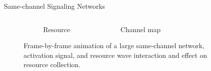 \begin{frame}{Same-channel Signaling Networks}

\begin{figure}

\begin{columns}
\end{columns}

\begin{columns}
\begin{column}{0.45\textwidth}
  \begin{subfigure}[b]{\textwidth}
  \caption{Resource}
  \end{subfigure}
\end{column}

\begin{column}{0.45\textwidth}
  \begin{subfigure}[b]{\textwidth}
  \caption{Channel map}
  \end{subfigure}
\end{column}

\begin{column}{0.1\textwidth}
  \begin{subfigure}[b]{\textwidth}
  \end{subfigure}
\end{column}

\end{columns}

\caption{
Frame-by-frame animation of a large same-channel network, activation signal, and resource wave interaction and effect on resource collection.
}

\end{figure}

\end{frame}

